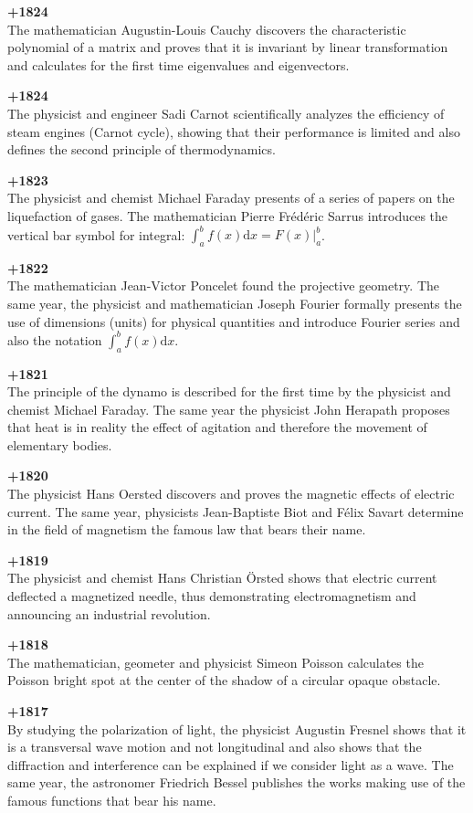 \textbf{+1824}\\
The mathematician Augustin-Louis Cauchy discovers the characteristic polynomial of a matrix and proves that it is invariant by linear transformation and calculates for the first time eigenvalues and eigenvectors.

\textbf{+1824}\\
The physicist and engineer Sadi Carnot scientifically analyzes the efficiency of steam engines (Carnot cycle), showing that their performance is limited and also defines the second principle of thermodynamics.

\textbf{+1823}\\
The physicist and chemist Michael Faraday presents of a series of papers on the liquefaction of gases.  The mathematician Pierre Frédéric Sarrus introduces the vertical bar symbol for integral: $\int_a^bf(x)\mathrm{d}x=F(x)|_a^b$.

\textbf{+1822}\\
The mathematician Jean-Victor Poncelet found the projective geometry. The same year, the physicist and mathematician Joseph Fourier formally presents the use of dimensions (units) for physical quantities and introduce Fourier series and also the notation $\int_a^bf(x)\mathrm{d}x$.

\textbf{+1821}\\
The principle of the dynamo is described for the first time by the physicist and chemist Michael Faraday. The same year the physicist John Herapath proposes that heat is in reality the effect of agitation and therefore the movement of elementary bodies.

\textbf{+1820}\\
The physicist Hans Oersted discovers and proves the magnetic effects of electric current. The same year, physicists Jean-Baptiste Biot and Félix Savart determine in the field of magnetism the famous law that bears their name.

\textbf{+1819}\\
The physicist and chemist Hans Christian Örsted shows that electric current deflected a magnetized needle, thus demonstrating electromagnetism and announcing an industrial revolution.

\textbf{+1818}\\
The mathematician, geometer and physicist Simeon Poisson calculates the Poisson bright spot at the center of the shadow of a circular opaque obstacle.

\textbf{+1817}\\
By studying the polarization of light, the physicist Augustin Fresnel shows that it is a transversal wave motion and not longitudinal and also shows that the diffraction and interference can be explained if we consider light as a wave. The same year, the astronomer Friedrich Bessel publishes the works making use of the famous functions that bear his name.

